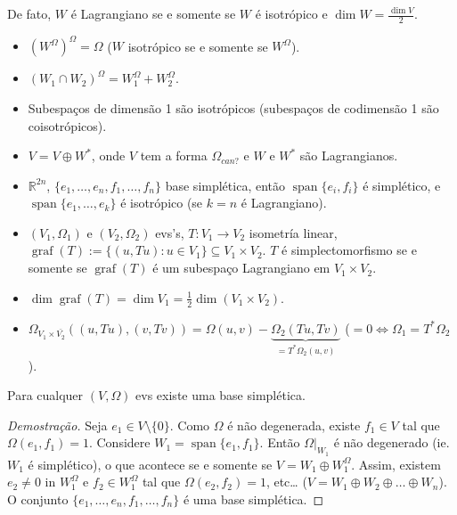 De fato, $W$ \'e Lagrangiano se e somente se  $W$ \'e isotr\'opico e $\dim W=\frac{\dim V}{2}$.

\begin{exercise}\leavevmode 
	\begin{itemize}
		\item $(W^{\Omega})^{\Omega}=\Omega$ ($W$ isotr\'opico se e somente se  $W^{\Omega}$).
		\item $(W_1\cap W_2)^{\Omega} =W_1^{\Omega} +W_2^{\Omega}$.
	\end{itemize}
\end{exercise}

\begin{example}\leavevmode 
	\begin{itemize}
		\item Subespa\c cos de dimens\~ao 1 s\~ao isotr\'opicos (subespa\c cos de codimens\~ao 1 s\~ao\\ coisotr\'opicos).
		\item $V=V\oplus W^{*}$, onde $V$ tem a forma $\Omega_{can?}$ e $W$ e $W^{*}$ s\~ao Lagrangianos.
		\item $\mathbb{R}^{2n}$, $\{e_1,\ldots,e_n,f_1,\ldots,f_n\} $ base simpl\'etica, ent\~ao $\operatorname{span} \{e_i,f_i\}$ \'e simpl\'etico, e \\$\operatorname{span} \{e_1,\ldots,e_k\} $ \'e isotr\'opico (se $k=n$ \'e Lagrangiano).
		\item $(V_1,\Omega_1)$ e $(V_2,\Omega_2)$ evs's, $T:V_1\to V_2$ isometr\'ia linear, $\operatorname{graf}(T):=\{(u,Tu):u\in V_1\} \subseteq V_1\times V_2$. $T$ \'e simplectomorfismo se e somente se $\operatorname{graf}(T)$ \'e um subespa\c co Lagrangiano em $V_1\times V_2$.
		\item $\dim \operatorname{graf}(T)=\dim V_1=\frac{1}{2}\dim (V_1\times V_2)$.
		\item $\Omega_{V_1\times \bar{V_2}}((u,Tu),(v,Tv))=\Omega(u,v)-\underbrace{\Omega_2(Tu,Tv)}_{=T^{*} \Omega_2(u,v)}$ ($=0\iff \Omega_1=T^{*} \Omega_2$).
	\end{itemize}
\end{example}

\begin{thm}\leavevmode
	Para cualquer $(V,\Omega)$ evs existe uma base simpl\'etica.
\end{thm}
\begin{proof}[Demostra\c c\~ao]
	Seja $e_1\in V\setminus \{0\} $. Como $\Omega$ \'e n\~ao degenerada, existe $f_1\in V$ tal que $\Omega(e_1,f_1)=1$. Considere $W_1=\operatorname{span}\{e_1,f_1\} $. Ent\~ao $\Omega|_{W_1}$ \'e n\~ao degenerado (ie. $W_1$ \'e simpl\'etico), o que acontece se e somente se $V=W_1\oplus W_1^{\Omega}$. Assim, existem $e_2\neq 0$ in $W_1^{\Omega}$ e $f_2\in W_1^{\Omega}$ tal que $\Omega(e_2,f_2)=1$, etc… ($V=W_1\oplus  W_2\oplus \ldots\oplus W_n$). O conjunto $\{e_1,\ldots,e_n,f_1,\ldots,f_n\} $ \'e uma base simpl\'etica.
\end{proof}

